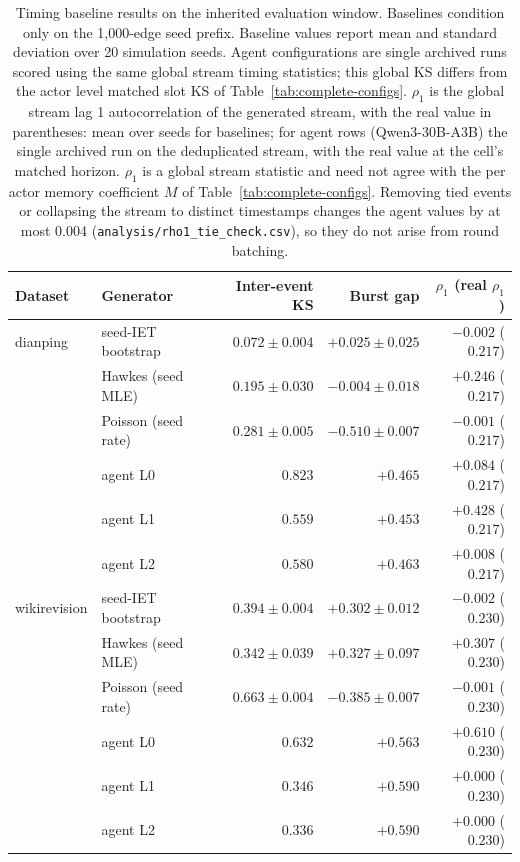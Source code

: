 \begin{table}[h]
\caption{Timing baseline results on the inherited evaluation window. Baselines condition only on the 1,000-edge seed prefix. Baseline values report mean and standard deviation over 20 simulation seeds. Agent configurations are single archived runs scored using the same global stream timing statistics; this global KS differs from the actor level matched slot KS of Table~\ref{tab:complete-configs}. $\rho_1$ is the global stream lag 1 autocorrelation of the generated stream, with the real value in parentheses: mean over seeds for baselines; for agent rows (Qwen3-30B-A3B) the single archived run on the deduplicated stream, with the real value at the cell's matched horizon. $\rho_1$ is a global stream statistic and need not agree with the per actor memory coefficient $M$ of Table~\ref{tab:complete-configs}. Removing tied events or collapsing the stream to distinct timestamps changes the agent values by at most 0.004 (\texttt{analysis/rho1\_tie\_check.csv}), so they do not arise from round batching.}
\label{tab:timing-baselines}
\centering\small
\begin{tabular}{llrrr}
\toprule
Dataset & Generator & Inter-event KS & Burst gap & $\rho_1$ (real $\rho_1$) \\
\midrule
dianping & seed-IET bootstrap & $0.072\pm0.004$ & $+0.025\pm0.025$ & $-0.002$ ($0.217$) \\
 & Hawkes (seed MLE) & $0.195\pm0.030$ & $-0.004\pm0.018$ & $+0.246$ ($0.217$) \\
 & Poisson (seed rate) & $0.281\pm0.005$ & $-0.510\pm0.007$ & $-0.001$ ($0.217$) \\
 & agent L0 & $0.823$ & $+0.465$ & $+0.084$ ($0.217$) \\
 & agent L1 & $0.559$ & $+0.453$ & $+0.428$ ($0.217$) \\
 & agent L2 & $0.580$ & $+0.463$ & $+0.008$ ($0.217$) \\
\addlinespace[2pt]
wikirevision & seed-IET bootstrap & $0.394\pm0.004$ & $+0.302\pm0.012$ & $-0.002$ ($0.230$) \\
 & Hawkes (seed MLE) & $0.342\pm0.039$ & $+0.327\pm0.097$ & $+0.307$ ($0.230$) \\
 & Poisson (seed rate) & $0.663\pm0.004$ & $-0.385\pm0.007$ & $-0.001$ ($0.230$) \\
 & agent L0 & $0.632$ & $+0.563$ & $+0.610$ ($0.230$) \\
 & agent L1 & $0.346$ & $+0.590$ & $+0.000$ ($0.230$) \\
 & agent L2 & $0.336$ & $+0.590$ & $+0.000$ ($0.230$) \\

\end{tabular}
\end{table}
